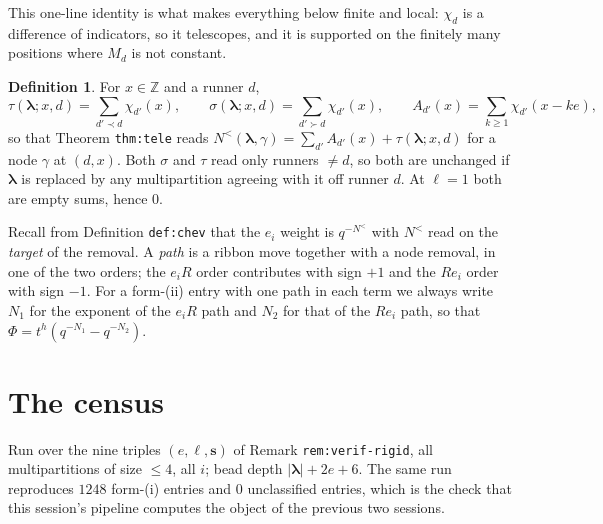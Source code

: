 \documentclass[11pt]{article}
\theoremstyle{definition}
\newtheorem{definition}[theorem]{Definition}
\theoremstyle{remark}
\newcommand{\Z}{\mathbb{Z}}
\newcommand{\bl}{\boldsymbol{\lambda}}
\newcommand{\bs}{\mathbf{s}}
\newcommand{\Nlt}{N^{<}}
\begin{document}
This one-line identity is what makes everything below finite and local: $\chi_d$ is a
difference of indicators, so it telescopes, and it is supported on the finitely many
positions where $M_d$ is not constant.

\begin{definition}\label{def:sigmatau}
For $x\in\Z$ and a runner $d$,
\[
\tau(\bl;x,d)=\sum_{d'\prec d}\chi_{d'}(x),\qquad
\sigma(\bl;x,d)=\sum_{d'\succ d}\chi_{d'}(x),\qquad
A_{d'}(x)=\sum_{k\ge1}\chi_{d'}(x-ke),
\]
so that Theorem \texttt{thm:tele} reads
$\Nlt(\bl,\gamma)=\sum_{d'}A_{d'}(x)+\tau(\bl;x,d)$ for a node $\gamma$ at $(d,x)$.
Both $\sigma$ and $\tau$ read only runners $\ne d$, so both are unchanged if $\bl$ is
replaced by any multipartition agreeing with it off runner $d$. At $\ell=1$ both are
empty sums, hence $0$.
\end{definition}

Recall from Definition \texttt{def:chev} that the $e_i$ weight is $q^{-\Nlt}$ with
$\Nlt$ read on the \emph{target} of the removal. A \emph{path} is a ribbon move together
with a node removal, in one of the two orders; the $e_iR$ order contributes with sign
$+1$ and the $Re_i$ order with sign $-1$. For a form-(ii) entry with one path in each
term we always write $N_1$ for the exponent of the $e_iR$ path and $N_2$ for that of the
$Re_i$ path, so that $\Phi=t^{h}(q^{-N_1}-q^{-N_2})$.

\section{The census}\label{sec:census}

Run over the nine triples $(e,\ell,\bs)$ of Remark \texttt{rem:verif-rigid}, all
multipartitions of size $\le4$, all $i$; bead depth $|\bl|+2e+6$. The same run
reproduces $1248$ form-(i) entries and $0$ unclassified entries, which is the check that
this session's pipeline computes the object of the previous two sessions.
\end{document}
